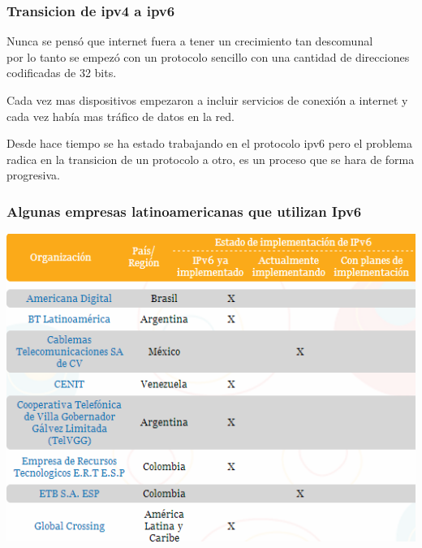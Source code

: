 \documentclass{beamer}
\begin{document}


\begin{frame}
	\frametitle{Transicion de ipv4 a ipv6}
	Nunca se pensó que internet fuera a tener un crecimiento tan descomunal\\ por lo tanto se empezó con un protocolo sencillo con una cantidad de direcciones codificadas de 32 bits.
	\par Cada vez mas dispositivos empezaron a incluir servicios de conexión a internet y cada vez había mas tráfico de datos en la red. 
	\par Desde hace tiempo se ha estado trabajando en el protocolo ipv6 pero el problema radica en la transicion de un protocolo a otro, es un proceso que se hara de forma progresiva.
\end{frame}


\begin{frame}
\frametitle{Algunas empresas latinoamericanas que utilizan Ipv6}

\includegraphics[height=1\textheight]{empresas ipv6 la.png}

\end{frame}
\end{document}
